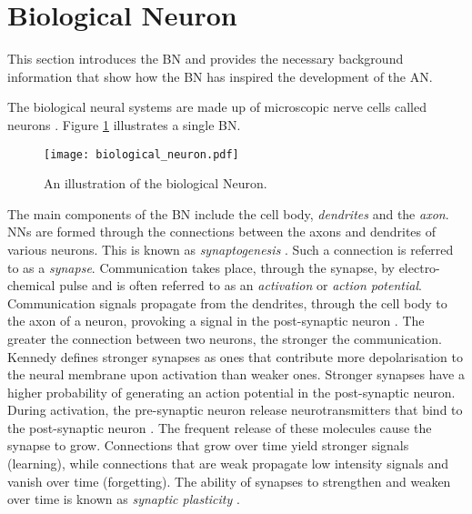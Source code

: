 \section{Biological Neuron}\label{sec:anns:bn}

This section introduces the \ac{BN} and provides the necessary background information that show how the \ac{BN} has inspired the development of the \ac{AN}.

The biological neural systems are made up of microscopic nerve cells called neurons \cite{ref:jain:1996}. Figure \ref{fig:biological_neuron} illustrates a single \ac{BN}.

\begin{figure}[htpb]
    \centering
    \texttt{[image: biological\_neuron.pdf]}
    \caption[The biological Neuron]{An illustration of the biological Neuron.}
    \label{fig:biological_neuron}
\end{figure}

\noindent
The main components of the \ac{BN} include the cell body, \textit{dendrites} and the \textit{axon}. \Acp{NN} are formed through the connections between the axons and dendrites of various neurons. This is known as \textit{synaptogenesis} \cite{ref:huttenlocher:1997}. Such a connection is referred to as a \textit{synapse}. Communication takes place, through the synapse, by electro-chemical pulse and is often referred to as an \textit{activation} or \textit{action potential}.  Communication signals propagate from the dendrites, through the cell body to the axon of a neuron, provoking a signal in the post-synaptic neuron \cite{ref:engelbrecht:2007}. The greater the connection between two neurons, the stronger the communication.  Kennedy \cite{ref:kennedy:2016} defines stronger synapses as ones that contribute more depolarisation to the neural membrane upon activation than weaker ones. Stronger synapses have a higher probability of generating an action potential in the post-synaptic neuron. During activation, the pre-synaptic neuron release neurotransmitters that bind to the post-synaptic neuron \cite{ref:khanacademy:synapse}. The frequent release of these molecules cause the synapse to grow. Connections that grow over time yield stronger signals (learning), while connections that are weak propagate low intensity signals and vanish over time (forgetting). The ability of synapses to strengthen and weaken over time is known as \textit{synaptic plasticity} \cite{ref:huttenlocher:1997}.

